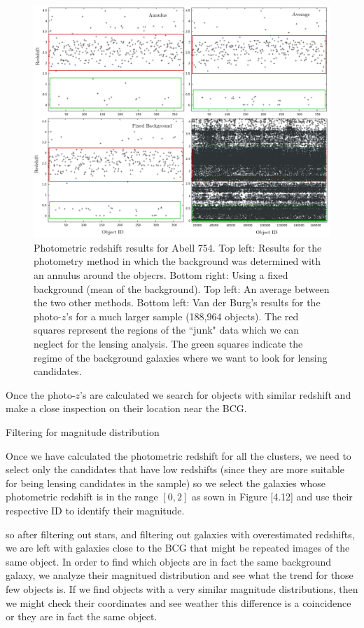 \begin{figure}[H]
\centering
\includegraphics[width=15cm]{images/photo_z_red_squares.png}
\caption[Photometric redshift results for Abell 754]{Photometric redshift results for Abell 754. Top left: Results for the photometry method in which the background was determined with an annulus around the objecrs. Bottom right: Using a fixed background (mean of the background). Top left: An average between the two other methods. Bottom left: Van der Burg's results for the photo-$z$'s for a much larger sample (188,964 objects). The red squares represent the regions of the ``junk" data which we can neglect for the lensing analysis. The green squares indicate the regime of the background galaxies where we want to look for lensing candidates.}
\end{figure}

Once the photo-$z$'s are calculated we search for objects with similar redshift and make a close inspection on their location near the BCG. 

Filtering for magnitude distribution

Once we have calculated the photometric redshift for all the clusters, we need to select only the candidates that have low redshifts (since they are more suitable for being lensing candidates in the sample) so we select the galaxies whose photometric redshift is in the range $[0,2]$ as sown in Figure [4.12] and use their respective ID to identify their magnitude. 

so after filtering out stars, and filtering out galaxies with overestimated redshifts, we are left with galaxies close to the BCG that might be repeated images of the same object. In order to find which objects are in fact the same background galaxy, we analyze their magnitued distribution and see what the trend for those few objects is. If we find objects with a very similar magnitude distributions, then we might check their coordinates and see weather this difference is a coincidence or they are in fact the same object.

